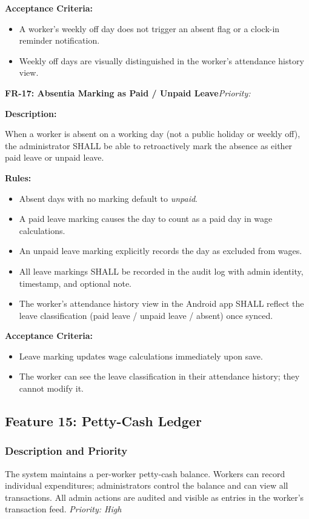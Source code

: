 \documentclass[12pt, a4paper]{article}
\newcommand{\frblock}[2]{%
    \noindent\textbf{#1}\hfill\textit{Priority: #2}%
    \par\smallskip%
}
\newcommand{\srsfield}[1]{\noindent\textbf{#1:}\par}
\begin{document}
\srsfield{Acceptance Criteria}
\begin{itemize}
    \item A worker's weekly off day does not trigger an absent flag or
          a clock-in reminder notification.
    \item Weekly off days are visually distinguished in the worker's
          attendance history view.
\end{itemize}

\bigskip
\frblock{FR-17: Absentia Marking as Paid / Unpaid Leave}{}

\srsfield{Description}
When a worker is absent on a working day (not a public holiday or weekly
off), the administrator SHALL be able to retroactively mark the absence
as either paid leave or unpaid leave.

\srsfield{Rules}
\begin{itemize}
    \item Absent days with no marking default to \textit{unpaid}.
    \item A paid leave marking causes the day to count as a paid day
          in wage calculations.
    \item An unpaid leave marking explicitly records the day as excluded
          from wages.
    \item All leave markings SHALL be recorded in the audit log with
          admin identity, timestamp, and optional note.
    \item The worker's attendance history view in the Android app SHALL
          reflect the leave classification (paid leave / unpaid leave /
          absent) once synced.
\end{itemize}

\srsfield{Acceptance Criteria}
\begin{itemize}
    \item Leave marking updates wage calculations immediately upon save.
    \item The worker can see the leave classification in their attendance
          history; they cannot modify it.
\end{itemize}

\subsection{Feature 15: Petty-Cash Ledger}

\subsubsection*{Description and Priority}
The system maintains a per-worker petty-cash balance. Workers can record
individual expenditures; administrators control the balance and can view
all transactions. All admin actions are audited and visible as entries in
the worker's transaction feed.
\hfill \textit{Priority: High}
\end{document}
